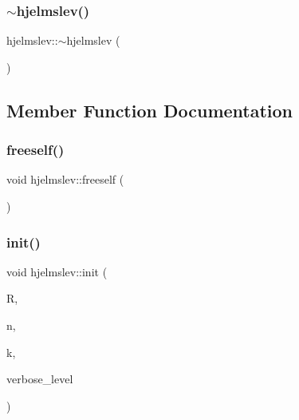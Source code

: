 \mbox{\label{classhjelmslev_accc21cc48c4eb982f508a9e349b41441}} 
\subsubsection{\texorpdfstring{$\sim$hjelmslev()}{~hjelmslev()}}
{\footnotesize\ttfamily hjelmslev\+::$\sim$hjelmslev (\begin{DoxyParamCaption}{ }\end{DoxyParamCaption})}



\subsection{Member Function Documentation}
\mbox{\label{classhjelmslev_ad18209f7108d6bad92e6a6266f7330f7}} 
\subsubsection{\texorpdfstring{freeself()}{freeself()}}
{\footnotesize\ttfamily void hjelmslev\+::freeself (\begin{DoxyParamCaption}{ }\end{DoxyParamCaption})}

\mbox{\label{classhjelmslev_a7b4d32f3bba7d1108e9940a7582009fd}} 
\subsubsection{\texorpdfstring{init()}{init()}}
{\footnotesize\ttfamily void hjelmslev\+::init (\begin{DoxyParamCaption}\item[{\mbox{\hyperlink{classfinite__ring}{finite\+\_\+ring}} $\ast$}]{R,  }\item[{\mbox{\hyperlink{galois_8h_a09fddde158a3a20bd2dcadb609de11dc}{I\+NT}}}]{n,  }\item[{\mbox{\hyperlink{galois_8h_a09fddde158a3a20bd2dcadb609de11dc}{I\+NT}}}]{k,  }\item[{\mbox{\hyperlink{galois_8h_a09fddde158a3a20bd2dcadb609de11dc}{I\+NT}}}]{verbose\+\_\+level }\end{DoxyParamCaption})}

